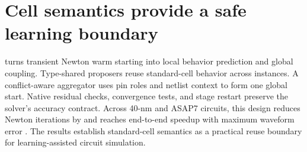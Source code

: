 \section{Cell semantics provide a safe learning boundary}
\label{sec:conclusion}

\system{} turns transient Newton warm starting into local behavior prediction and global coupling. Type-shared proposers reuse standard-cell behavior across instances. A conflict-aware aggregator uses pin roles and netlist context to form one global start. Native residual checks, convergence tests, and stage restart preserve the solver's accuracy contract. Across 40-nm and ASAP7 circuits, this design reduces Newton iterations by \NewtonReduction{} and reaches \HeadlineSpeedup{} end-to-end speedup with maximum waveform error \WaveformAbsError{}. The results establish standard-cell semantics as a practical reuse boundary for learning-assisted circuit simulation.


